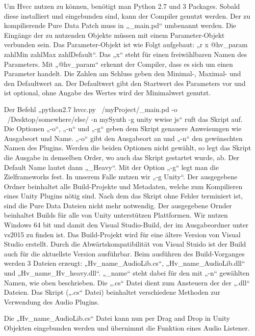 \documentclass[a4paper, 11pt]{scrartcl}
\begin{document}
Um Hvcc nutzen zu können, benötigt man Python 2.7 und 3 Packages. Sobald diese installiert und eingebunden sind, kann der Compiler genutzt werden. Der zu kompilierende Pure Data Patch muss in „_main.pd“ umbenannt werden. Die Eingänge der zu nutzenden Objekte müssen mit einem Parameter-Objekt verbunden sein. Das Parameter-Objekt ist wie Folgt aufgebaut: „r x @hv_param zahlMin zahlMax zahlDefault“. Das „x“ steht für einen freiwählbaren Namen des Parameters. Mit „@hv_param“ erkennt der Compiler, dass es sich um einen Parameter handelt. Die Zahlen am Schluss geben den Minimal-, Maximal- und den Defaultwert an. Der Defaultwert gibt den Startwert des Parameters vor und ist optional, ohne Angabe des Wertes wird der Minimalwert genutzt. 

Der Befehl „python2.7 hvcc.py ~/myProject/_main.pd -o ~/Desktop/somewhere/else/ -n mySynth -g unity wwise js“ ruft das Skript auf. Die Optionen „-o“, „-n“ und „-g“ geben dem Skript genauere Anweisungen wie Ausgabeort und Name. 
„-o“ gibt den Ausgabeort an und „-n“ den gewünschten Namen des Plugins. Werden die beiden Optionen nicht gewählt, so legt das Skript die Ausgabe in demselben Order, wo auch das Skript gestartet wurde, ab. Der Default Name lautet dann „_Heavy“. Mit der Option „-g“ legt man die Zielframeworks fest. In unserem Falle nutzen wir „-g Unity“. Der ausgegebene Ordner beinhaltet alle Build-Projekte und Metadaten, welche zum Kompilieren eines Unity Plugins nötig sind. Nach dem das Skript ohne Fehler terminiert ist, sind die Pure Data Dateien nicht mehr notwendig. Der ausgegebene Ornder beinhaltet Builds für alle von Unity unterstützen Plattformen. Wir nutzen Windows 64 bit und damit den Visual Studio-Build, der im Ausgabeordner unter vs2015 zu finden ist. Das Build-Projekt wird für eine ältere Version von Visual Studio erstellt. Durch die Abwärtskompatibilität von Visual Stuido ist der Build auch für die aktuellste Version ausführbar.
Beim ausführen des Build-Vorganges werden 3 Dateien erzeugt: „Hv_name_AudioLib.cs“, „Hv_name_AudioLib.dll“ und „Hv_name_Hv_heavy.dll“. „_name“ steht dabei für den mit „-n“ gewählten Namen, wie oben beschrieben.  Die „.cs“ Datei dient zum Ansteuern der der „.dll“ Dateien. Das Skript („.cs“ Datei) beinhaltet verschiedene Methoden zur Verwendung des Audio Plugins. 

Die „Hv_name_AudioLib.cs“ Datei kann nun per Drag and Drop in Unity Objekten eingebunden werden und übernimmt die Funktion eines Audio Listener.
\end{document}
